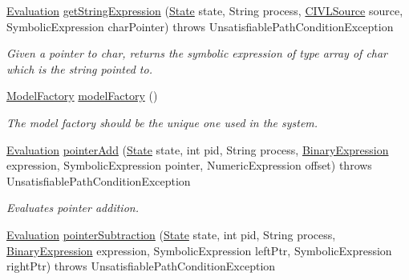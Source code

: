 \begin{DoxyCompactItemize}
\item 
\hyperlink{classedu_1_1udel_1_1cis_1_1vsl_1_1civl_1_1semantics_1_1IF_1_1Evaluation}{Evaluation} \hyperlink{classedu_1_1udel_1_1cis_1_1vsl_1_1civl_1_1semantics_1_1common_1_1CommonEvaluator_a0ad771706f43f1cbba709b8ffe816e2b}{get\+String\+Expression} (\hyperlink{interfaceedu_1_1udel_1_1cis_1_1vsl_1_1civl_1_1state_1_1IF_1_1State}{State} state, String process, \hyperlink{interfaceedu_1_1udel_1_1cis_1_1vsl_1_1civl_1_1model_1_1IF_1_1CIVLSource}{C\+I\+V\+L\+Source} source, Symbolic\+Expression char\+Pointer)  throws Unsatisfiable\+Path\+Condition\+Exception 
\begin{DoxyCompactList}\small\item\em Given a pointer to char, returns the symbolic expression of type array of char which is the string pointed to. \end{DoxyCompactList}\item 
\hyperlink{interfaceedu_1_1udel_1_1cis_1_1vsl_1_1civl_1_1model_1_1IF_1_1ModelFactory}{Model\+Factory} \hyperlink{classedu_1_1udel_1_1cis_1_1vsl_1_1civl_1_1semantics_1_1common_1_1CommonEvaluator_aa2850d34b89e037f7269c34a39741101}{model\+Factory} ()
\begin{DoxyCompactList}\small\item\em The model factory should be the unique one used in the system. \end{DoxyCompactList}\item 
\hyperlink{classedu_1_1udel_1_1cis_1_1vsl_1_1civl_1_1semantics_1_1IF_1_1Evaluation}{Evaluation} \hyperlink{classedu_1_1udel_1_1cis_1_1vsl_1_1civl_1_1semantics_1_1common_1_1CommonEvaluator_abb0ca940d4749ccac9b3e5995e7dda52}{pointer\+Add} (\hyperlink{interfaceedu_1_1udel_1_1cis_1_1vsl_1_1civl_1_1state_1_1IF_1_1State}{State} state, int pid, String process, \hyperlink{interfaceedu_1_1udel_1_1cis_1_1vsl_1_1civl_1_1model_1_1IF_1_1expression_1_1BinaryExpression}{Binary\+Expression} expression, Symbolic\+Expression pointer, Numeric\+Expression offset)  throws Unsatisfiable\+Path\+Condition\+Exception 
\begin{DoxyCompactList}\small\item\em Evaluates pointer addition. \end{DoxyCompactList}\item 
\hyperlink{classedu_1_1udel_1_1cis_1_1vsl_1_1civl_1_1semantics_1_1IF_1_1Evaluation}{Evaluation} \hyperlink{classedu_1_1udel_1_1cis_1_1vsl_1_1civl_1_1semantics_1_1common_1_1CommonEvaluator_ad519044578bac65ecd81d1d455eab74d}{pointer\+Subtraction} (\hyperlink{interfaceedu_1_1udel_1_1cis_1_1vsl_1_1civl_1_1state_1_1IF_1_1State}{State} state, int pid, String process, \hyperlink{interfaceedu_1_1udel_1_1cis_1_1vsl_1_1civl_1_1model_1_1IF_1_1expression_1_1BinaryExpression}{Binary\+Expression} expression, Symbolic\+Expression left\+Ptr, Symbolic\+Expression right\+Ptr)  throws Unsatisfiable\+Path\+Condition\+Exception 

\end{DoxyCompactItemize}
